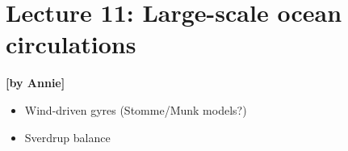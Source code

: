 
\section{Lecture 11: Large-scale ocean circulations}\label{sec:lecture11}
\begin{flushright}\textbf{[by Annie]}\end{flushright}
  
 \begin{itemize}
   \item
   Wind-driven gyres (Stomme/Munk models?)
   \item
   Sverdrup balance
 \end{itemize}
